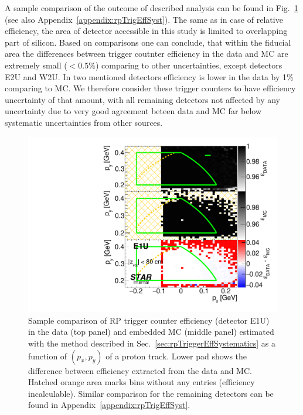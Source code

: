 A sample comparison of the outcome of described analysis can be found in Fig.~\ref{fig:relativeRpRecoEff_E1U} (see also Appendix~\ref{appendix:rpTrigEffSyst}). The same as in case of relative efficiency, the area of detector accessible in this study is limited to overlapping part of silicon. Based on comparisons one can conclude, that within the fiducial area the differences between trigger coutnter efficiency in the data and MC are extremely small ($<0.5\%$) comparing to other uncertainties, except detectors E2U and W2U. In two mentioned detectors efficiency is lower in the data by 1\% comparing to MC. We therefore consider these trigger counters to have efficiency uncertainty of that amount, with all remaining detectors not affected by any uncertainty due to very good agreement beteen data and MC far below  systematic uncertainties from other sources.

\begin{figure}[h]%
	\centering
	\parbox{0.4725\textwidth}{
		\centering
		\includegraphics[width=\linewidth,page=1]{graphics/systematicsEfficiency/RpSyst/relativeTriggerEff2D_pxpy.pdf}%
	}
	\quad
	\parbox{0.4725\textwidth}{
		\centering%
		\caption[Coparison of estimated RP trigger counter efficiency in 2D (detector E1U).]%
    {Sample comparison of RP trigger counter efficiency (detector E1U) in the data (top panel) and embedded MC (middle panel) estimated with the method described in Sec.~\ref{sec:rpTriggerEffSystematics} as a function of $(p_{x},p_{y})$ of a proton track. Lower pad shows the difference between efficiency extracted from the data and MC. Hatched orange area marks bins without any entries (efficiency incalculable). Similar comparison for the remaining detectors can be found in Appendix~\ref{appendix:rpTrigEffSyst}.%
    \label{fig:relativeRpRecoEff_E1U}%
    }
	}
\end{figure}




